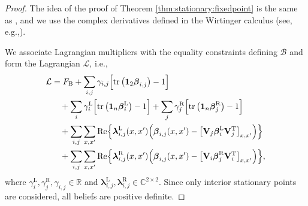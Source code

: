 \documentclass[conference]{IEEEtran}
\theoremstyle{plain}
\theoremstyle{definition}
\providecommand{\R}{\mathbb {R}}
\providecommand{\C}{\mathbb {C}}
\newcommand{\T}{\mathrm{T}}
\newcommand{\B}{\mathrm{B}}
\newcommand{\tr}{\operatorname{tr}}
\newcommand{\bbeta}{\boldsymbol{\beta}}
\newcommand{\br}[1]{\bbeta^{\mathrm{R}}_{#1}}
\newcommand{\bl}[1]{\bbeta^{\mathrm{L}}_{#1}}
\newcommand{\be}[1]{\bbeta_{#1}}
\begin{document}
 \begin{proof}
  The idea of the proof of Theorem \ref{thm:stationary:fixedpoint} is the same as
  \cite[Thm.~2]{yedidiaConstructingFreeenergyApproximations2005}, and we use the complex derivatives
  defined in the Wirtinger calculus (see, e.g.,\cite{kreutz-delgadoComplexGradientOperator2009}).

  We associate Lagrangian multipliers with the equality constraints defining
  $\mathcal B$ and form the Lagrangian $\mathcal{L}$, i.e.,
  \begin{align*}
   \mathcal L & = F_\B+\sum_{i,j}\gamma_{i,j} \Bigl[\tr \big(\mathbf{1}_{2}\be{i,j}\big)-1\Bigr]    \\
              & \quad +\sum_i \gamma^{\mathrm L}_i \Bigl[\tr \big(\mathbf{1}_{n}\bl{i}\big)-1\Bigr]
   +\sum_j \gamma^{\mathrm R}_j \Bigl[\tr \big(\mathbf{1}_{n}\br{j}\big)-1\Bigr]                    \\
              & \quad +\sum_{i,j}\sum_{x,x'}\mathrm{Re}
   \Bigl\{\boldsymbol{\lambda}^{\mathrm L}_{i,j}(x,x')
   \Bigl(\be{i,j}(x,x')-\bigl[\mathbf V_j\bl{i}\mathbf V_j^\T\bigr]_{x,x'}\Bigr)\Bigr\}             \\
              & \quad +\sum_{i,j}\sum_{x,x'}\mathrm{Re}
   \Bigl\{\boldsymbol{\lambda}^{\mathrm R}_{i,j}(x,x')
   \Bigl(\be{i,j}(x,x')-\bigl[\mathbf V_i\br{j}\mathbf V_i^\T\bigr]_{x,x'}\Bigr)\Bigr\},
  \end{align*}
  where $\gamma^{\mathrm L}_i,\gamma^{\mathrm R}_j,\gamma_{i,j}\in\R$ and $\boldsymbol{\lambda}^{\mathrm L}_{i,j},\boldsymbol{\lambda}^{\mathrm R}_{i,j}\in\C^{2\times 2}$.
  Since only interior stationary points are considered, all beliefs are positive definite.


\end{proof}
\end{document}
